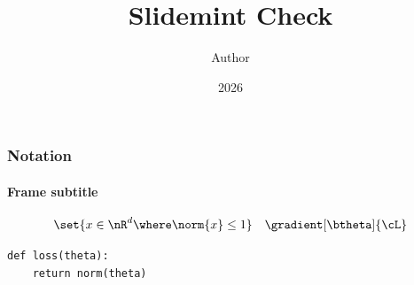 \documentclass[notheorems,aspectratio=169]{beamer}
\title{Slidemint Check}
\author{Author}
\date{2026}
\begin{document}
\maketitle

\begin{frame}[fragile]
  \frametitle{Notation}
  \framesubtitle{Frame subtitle}

  \[
    \set{x \in \nR^d \where \norm{x} \leq 1}
    \quad
    \gradient[\btheta]{\cL}
  \]

  \begin{verbatim}
def loss(theta):
    return norm(theta)
  \end{verbatim}
\end{frame}
\end{document}
